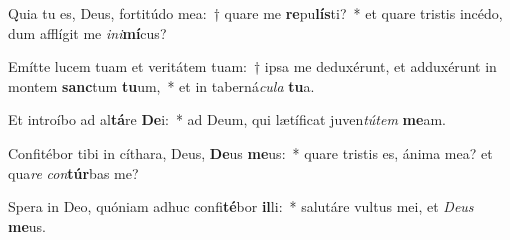\item Quia tu es, Deus, fortitúdo mea:~† quare me \textbf{re}pu\textbf{lís}ti?~* et quare tristis incédo, dum afflígit me \textit{in}\textit{i}\textbf{mí}cus?
\item Emítte lucem tuam et veritátem tuam:~† ipsa me deduxérunt, et adduxérunt in montem \textbf{sanc}tum \textbf{tu}um,~* et in taberná\textit{cu}\textit{la} \textbf{tu}a.
\item Et introíbo ad al\textbf{tá}re \textbf{De}i:~* ad Deum, qui lætíficat juven\textit{tú}\textit{tem} \textbf{me}am.
\item Confitébor tibi in cíthara, Deus, \textbf{De}us \textbf{me}us:~* quare tristis es, ánima mea? et qua\textit{re} \textit{con}\textbf{túr}bas me?
\item Spera in Deo, quóniam adhuc confi\textbf{té}bor \textbf{il}li:~* salutáre vultus mei, et \textit{De}\textit{us} \textbf{me}us.
